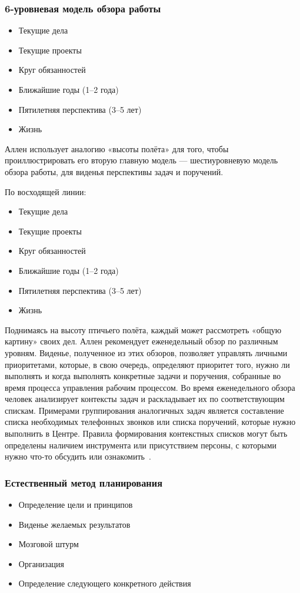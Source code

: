 \documentclass{../industrial-development}
\begin{document}
\begin{frame} \frametitle{6-уровневая модель обзора работы}
  \begin{itemize}
  \item Текущие дела
  \item Текущие проекты
  \item Круг обязанностей
  \item Ближайшие годы (1--2 года)
  \item Пятилетняя перспектива (3--5 лет)
  \item Жизнь
  \end{itemize}
\end{frame}

\lecturenotes

Аллен использует аналогию «высоты полёта» для того, чтобы проиллюстрировать его вторую главную модель --- шестиуровневую модель обзора работы, для виденья перспективы задач и поручений.

По восходящей линии:
\begin{itemize}
\item Текущие дела
\item Текущие проекты
\item Круг обязанностей
\item Ближайшие годы (1--2 года)
\item Пятилетняя перспектива (3--5 лет)
\item Жизнь
\end{itemize}

Поднимаясь на высоту птичьего полёта, каждый может рассмотреть «общую картину» своих дел.
Аллен рекомендует еженедельный обзор по различным уровням. Виденье, полученное из этих обзоров, позволяет управлять личными приоритетами, которые, в свою очередь, определяют приоритет того, нужно ли выполнять и когда выполнять конкретные задачи и поручения, собранные во время процесса управления рабочим процессом. Во время еженедельного обзора человек анализирует контексты задач и раскладывает их по соответствующим спискам. Примерами группирования аналогичных задач является составление списка необходимых телефонных звонков или списка поручений, которые нужно выполнить в Центре. Правила формирования контекстных списков могут быть определены наличием инструмента или присутствием персоны, с которыми нужно что-то обсудить или ознакомить~\cite{GTDWikipedia}.

\begin{frame} \frametitle{Естественный метод планирования}
  \begin{itemize}
  \item Определение цели и принципов
  \item Виденье желаемых результатов
  \item Мозговой штурм
  \item Организация
  \item Определение следующего конкретного действия
  \end{itemize}
\end{frame}
\end{document}
